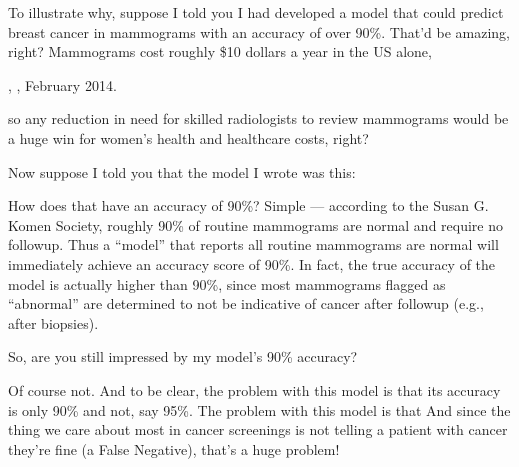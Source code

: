 \documentclass[letterpaper,10pt,english]{jupyterBook}
\begin{document}
\sphinxAtStartPar
To illustrate why, suppose I told you I had developed a model that could predict breast cancer in mammograms with an accuracy of over 90\%. That’d be amazing, right? Mammograms cost roughly \$10  dollars a year in the US alone,%
\begin{footnote}[1]\sphinxAtStartFootnote
{}, , February 2014.
%
\end{footnote} so any reduction in need for skilled radiologists to review mammograms would be a huge win for women’s health and healthcare costs, right?

\sphinxAtStartPar
Now suppose I told you that the model I wrote was this:

\begin{sphinxVerbatim}[commandchars=\\\{\}]
 
      
     
\end{sphinxVerbatim}

\sphinxAtStartPar
How does that have an accuracy of 90\%? Simple — according to the Susan G. Komen Society, roughly 90\% of routine mammograms are normal and require no followup. Thus a “model” that reports all routine mammograms are normal will immediately achieve an accuracy score of 90\%. In fact, the true accuracy of the model is actually higher than 90\%, since most mammograms flagged as “abnormal” are determined to not be indicative of cancer after followup (e.g., after biopsies).

\sphinxAtStartPar
So, are you still impressed by my model’s 90\% accuracy?

\sphinxAtStartPar
Of course not. And to be clear, the problem with this model is  that its accuracy is only 90\% and not, say 95\%. The problem with this model is that  And since the thing we care about most in cancer screenings is not telling a patient with cancer they’re fine (a False Negative), that’s a huge problem!
\end{document}
